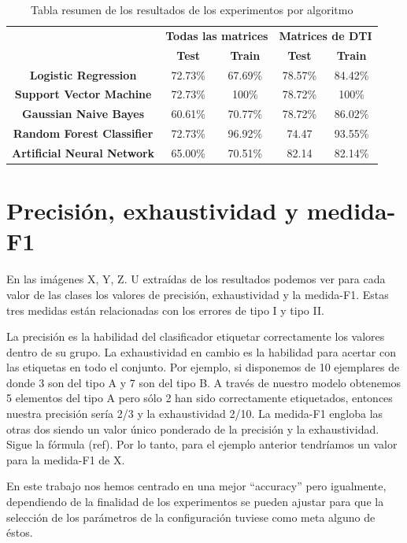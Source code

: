 \begin{table}[H]
\centering
\begin{tabular}{c|c|c|c|c|}
\cline{2-5}
                                        & \multicolumn{2}{c|}{\textbf{Todas las matrices}} & \multicolumn{2}{c|}{\textbf{Matrices de DTI}} \\ \cline{2-5} 
                                        & \textbf{Test}          & \textbf{Train}          & \textbf{Test}         & \textbf{Train}        \\ \hline
\multicolumn{1}{|c|}{\textbf{Logistic Regression}} & 72.73\%                & 67.69\%                 & 78.57\%               & 84.42\%               \\ \hline
\multicolumn{1}{|c|}{\textbf{Support Vector Machine}}      & 72.73\%                & 100\%                   & 78.72\%               & 100\%                 \\ \hline
\multicolumn{1}{|c|}{\textbf{Gaussian Naive Bayes}}    & 60.61\%                & 70.77\%                 & 78.72\%               & 86.02\%               \\ \hline
\multicolumn{1}{|c|}{\textbf{Random Forest Classifier}}   & 72.73\%                & 96.92\%                 & 74.47                 & 93.55\%               \\ \hline
\multicolumn{1}{|c|}{\textbf{Artificial Neural Network}}      & 65.00\%                & 70.51\%                 & 82.14                 & 82.14\%               \\ \hline
\end{tabular}
\caption{Tabla resumen de los resultados de los experimentos por algoritmo}
\label{table:resultados}

\end{table}

\section{Precisión,  exhaustividad y  medida-F1}

En las imágenes X, Y, Z. U extraídas de los resultados podemos ver para cada valor de las clases los valores de precisión,  exhaustividad y  la medida-F1. Estas tres medidas están relacionadas con los errores de tipo I y tipo II. 



La precisión es la habilidad del clasificador etiquetar correctamente los valores dentro de su grupo. La exhaustividad en cambio es la habilidad para acertar con las etiquetas en todo el conjunto. Por ejemplo, si disponemos de 10 ejemplares de donde 3 son del tipo A y 7 son del tipo B. A través de nuestro modelo obtenemos 5 elementos del tipo A pero sólo 2 han sido correctamente etiquetados, entonces nuestra precisión sería 2/3 y la exhaustividad 2/10. La medida-F1 engloba las otras dos siendo un valor único ponderado de la precisión y la exhaustividad. Sigue la fórmula (ref). Por lo tanto, para el ejemplo anterior tendríamos un valor para la medida-F1 de X. 



En este trabajo nos hemos centrado en una mejor ``accuracy'' pero igualmente, dependiendo de la finalidad de los experimentos se pueden ajustar para que la selección de los parámetros de la configuración tuviese como meta alguno de éstos.
